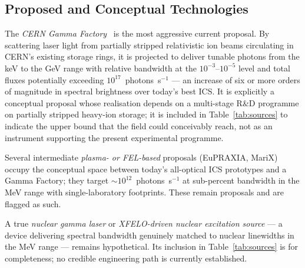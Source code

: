 \documentclass[conference]{IEEEtran}
\begin{document}
\subsection{Proposed and Conceptual Technologies}
The \emph{CERN Gamma Factory}~\cite{krasny2015gammafactory} is the most aggressive current proposal. By scattering laser light from partially stripped relativistic ion beams circulating in CERN's existing storage rings, it is projected to deliver tunable photons from the keV to the GeV range with relative bandwidth at the $10^{-3}\text{--}10^{-5}$ level and total fluxes potentially exceeding $10^{17}$~photons~s$^{-1}$ --- an increase of six or more orders of magnitude in spectral brightness over today's best ICS. It is explicitly a conceptual proposal whose realisation depends on a multi-stage R\&D programme on partially stripped heavy-ion storage; it is included in Table~\ref{tab:sources} to indicate the upper bound that the field could conceivably reach, not as an instrument supporting the present experimental programme.

Several intermediate \emph{plasma- or FEL-based} proposals (EuPRAXIA, MariX) occupy the conceptual space between today's all-optical ICS prototypes and a Gamma Factory; they target $\sim 10^{12}$~photons~s$^{-1}$ at sub-percent bandwidth in the MeV range with single-laboratory footprints. These remain proposals and are flagged as such.

A true \emph{nuclear gamma laser} or \emph{XFELO-driven nuclear excitation source} --- a device delivering spectral bandwidth genuinely matched to nuclear linewidths in the MeV range --- remains hypothetical. Its inclusion in Table~\ref{tab:sources} is for completeness; no credible engineering path is currently established.
\end{document}
